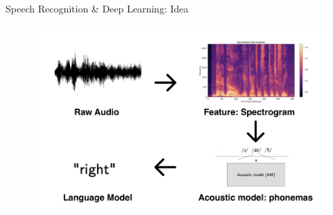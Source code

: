 \begin{frame}{Speech Recognition \& Deep Learning: Idea}
	\begin{figure}
		\centering
		\includegraphics[width=0.99\linewidth]{figs/asr.png}
	\end{figure}
\end{frame}
